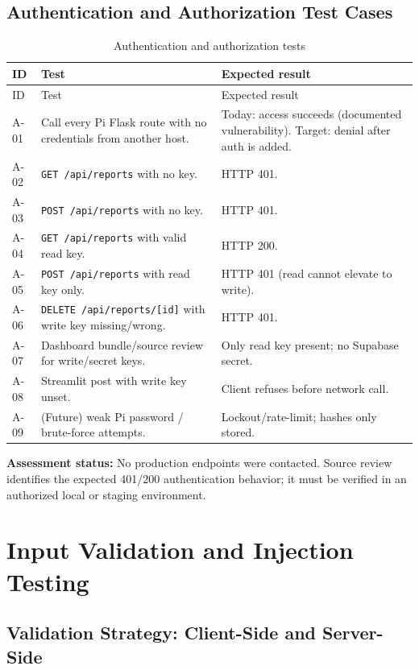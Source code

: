 \documentclass[12pt]{article}
\newcommand{\toprule}{\hline}
\newcommand{\midrule}{\hline}
\newcommand{\bottomrule}{\hline}
\begin{document}
\subsection{Authentication and Authorization Test Cases}

\begin{longtable}{p{}p{}p{}}
\caption{Authentication and authorization tests}\label{tab:auth-tests}\\
\toprule
ID & Test & Expected result \\
\midrule
\endfirsthead
\toprule
ID & Test & Expected result \\
\midrule
\endhead
A-01 & Call every Pi Flask route with no credentials from another host. & Today: access succeeds (documented vulnerability). Target: denial after auth is added. \\
A-02 & \texttt{GET /api/reports} with no key. & HTTP 401. \\
A-03 & \texttt{POST /api/reports} with no key. & HTTP 401. \\
A-04 & \texttt{GET /api/reports} with valid read key. & HTTP 200. \\
A-05 & \texttt{POST /api/reports} with read key only. & HTTP 401 (read cannot elevate to write). \\
A-06 & \texttt{DELETE /api/reports/[id]} with write key missing/wrong. & HTTP 401. \\
A-07 & Dashboard bundle/source review for write/secret keys. & Only read key present; no Supabase secret. \\
A-08 & Streamlit post with write key unset. & Client refuses before network call. \\
A-09 & (Future) weak Pi password / brute-force attempts. & Lockout/rate-limit; hashes only stored. \\
\bottomrule
\end{longtable}

\textbf{Assessment status:} No production endpoints were contacted. Source review
identifies the expected 401/200 authentication behavior; it must be verified in an
authorized local or staging environment.

\section{Input Validation and Injection Testing}
\label{sec:validation}

\subsection{Validation Strategy: Client-Side and Server-Side}
\end{document}
